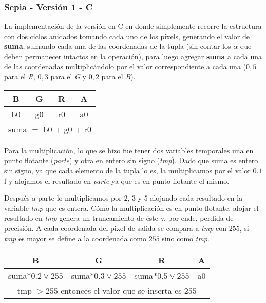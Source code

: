 \subsubsection{Sepia - Versión 1 - C}

La implementación de la versión en C en donde simplemente recorre la estructura con dos ciclos anidados tomando cada uno de los pixels, generando el valor de \textbf{suma}, sumando cada una de las coordenadas de la tupla (sin contar los $\alpha$ que deben permanecer intactos en la operación), para luego agregar \textbf{suma} a cada una de las coordenadas multiplicándolo por el valor correspondiente a cada una ($0,5$ para el \textit{R}, $0,3$ para el \textit{G} y $0,2$ para el \textit{B}).

\begin{table}[h]
	\centering
	\begin{tabular}{| c | c | c | c |}
		\hline
		B & G & R & A  \\ \hline
		b0 & g0 & r0 & a0  \\ \hline
		\multicolumn{4}{|c|}{suma $=$ b0 + g0 + r0} \\ \hline
	\end{tabular}
\end{table}

Para la multiplicación, lo que se hizo fue tener dos variables temporales una en punto flotante (\textit{parte}) y otra en entero sin signo (\textit{tmp}). Dado que suma es entero sin signo, ya que cada elemento de la tupla lo es, la multiplicamos por el valor $0\text{.}1$f y alojamos el resultado en \textit{parte} ya que es en punto flotante el mismo.

Después a parte lo multiplicamos por $2$, $3$ y $5$ alojando cada resultado en la variable \textit{tmp} que es entera. Cómo la multiplicación es en punto flotante, alojar el resultado en \textit{tmp} genera un truncamiento de éste y, por ende, perdida de precisión.
A cada coordenada del pixel de salida se compara a \textit{tmp} con $255$, si \textit{tmp} es mayor se define a la coordenada como $255$ sino como \textit{tmp}.

\begin{table}[h]
	\centering
	\begin{tabular}{| c | c | c | c |}
		\hline
		B & G & R & A  \\ \hline
		suma$*0.2 \lor 255$ & suma$*0.3 \lor 255$ & suma$*0.5 \lor 255$ & a0  \\ \hline
		\multicolumn{4}{c}{tmp $>255$ entonces el valor que se inserta es $255$}
	\end{tabular}
\end{table}